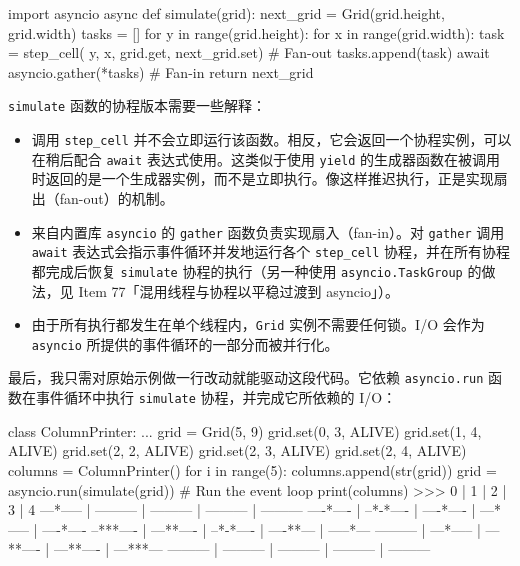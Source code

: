 \begin{codebox}[python]
import asyncio
async def simulate(grid):
    next_grid = Grid(grid.height, grid.width)
    tasks = []
    for y in range(grid.height):
        for x in range(grid.width):
             task = step_cell(
    y, x, grid.get, next_grid.set)        # Fan-out
            tasks.append(task)
    await asyncio.gather(*tasks)                      # Fan-in
    return next_grid
\end{codebox}

\texttt{simulate} 函数的协程版本需要一些解释：

\begin{itemize}
\item 调用 \texttt{step\_cell} 并不会立即运行该函数。相反，它会返回一个协程实例，可以在稍后配合 \texttt{await} 表达式使用。这类似于使用 \texttt{yield} 的生成器函数在被调用时返回的是一个生成器实例，而不是立即执行。像这样推迟执行，正是实现扇出（fan-out）的机制。
\item 来自内置库 \texttt{asyncio} 的 \texttt{gather} 函数负责实现扇入（fan-in）。对 \texttt{gather} 调用 \texttt{await} 表达式会指示事件循环并发地运行各个 \texttt{step\_cell} 协程，并在所有协程都完成后恢复 \texttt{simulate} 协程的执行（另一种使用 \texttt{asyncio.TaskGroup} 的做法，见 Item 77「混用线程与协程以平稳过渡到 asyncio」）。
\item 由于所有执行都发生在单个线程内，\texttt{Grid} 实例不需要任何锁。I/O 会作为 \texttt{asyncio} 所提供的事件循环的一部分而被并行化。
\end{itemize}

最后，我只需对原始示例做一行改动就能驱动这段代码。它依赖 \texttt{asyncio.run} 函数在事件循环中执行 \texttt{simulate} 协程，并完成它所依赖的 I/O：

\begin{codebox}[python]
class ColumnPrinter:
    ...
grid = Grid(5, 9)
grid.set(0, 3, ALIVE)
grid.set(1, 4, ALIVE)
grid.set(2, 2, ALIVE)
grid.set(2, 3, ALIVE)
grid.set(2, 4, ALIVE)
columns = ColumnPrinter()
for i in range(5):
    columns.append(str(grid))
    grid = asyncio.run(simulate(grid))  # Run the event loop
print(columns)
>>>
    0     |     1     |     2     |     3     |     4
---*----- | --------- | --------- | --------- | ---------
----*---- | --*-*---- | ----*---- | ---*----- | ----*----
--***---- | ---**---- | --*-*---- | ----**--- | -----*---
--------- | ---*----- | ---**---- | ---**---- | ---***---
--------- | --------- | --------- | --------- | ---------
\end{codebox}

